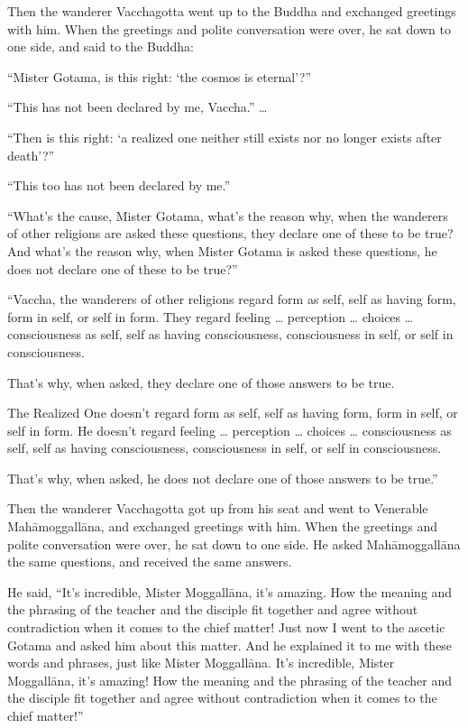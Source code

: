 \documentclass[12pt,openany]{book}%
\begin{document}
Then the wanderer Vacchagotta went up to the Buddha and exchanged greetings with him. When the greetings and polite conversation were over, he sat down to one side, and said to the Buddha: 

“Mister Gotama, is this right: ‘the cosmos is eternal’?” 

“This has not been declared by me, Vaccha.” … 

“Then is this right: ‘a realized one neither still exists nor no longer exists after death’?” 

“This too has not been declared by me.” 

“What’s the cause, Mister Gotama, what’s the reason why, when the wanderers of other religions are asked these questions, they declare one of these to be true? And what’s the reason why, when Mister Gotama is asked these questions, he does not declare one of these to be true?” 

“Vaccha, the wanderers of other religions regard form as self, self as having form, form in self, or self in form. They regard feeling … perception … choices … consciousness as self, self as having consciousness, consciousness in self, or self in consciousness. 

That’s why, when asked, they declare one of those answers to be true. 

The Realized One doesn’t regard form as self, self as having form, form in self, or self in form. He doesn’t regard feeling … perception … choices … consciousness as self, self as having consciousness, consciousness in self, or self in consciousness. 

That’s why, when asked, he does not declare one of those answers to be true.” 

Then the wanderer Vacchagotta got up from his seat and went to Venerable \textsanskrit{Mahāmoggallāna}, and exchanged greetings with him. When the greetings and polite conversation were over, he sat down to one side. He asked \textsanskrit{Mahāmoggallāna} the same questions, and received the same answers. 

He said, “It’s incredible, Mister \textsanskrit{Moggallāna}, it’s amazing. How the meaning and the phrasing of the teacher and the disciple fit together and agree without contradiction when it comes to the chief matter! Just now I went to the ascetic Gotama and asked him about this matter. And he explained it to me with these words and phrases, just like Mister \textsanskrit{Moggallāna}. It’s incredible, Mister \textsanskrit{Moggallāna}, it’s amazing! How the meaning and the phrasing of the teacher and the disciple fit together and agree without contradiction when it comes to the chief matter!” 
\end{document}
